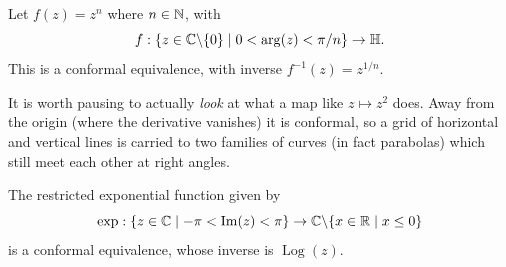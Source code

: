 \documentclass[a4paper]{scrartcl}
\begin{document}
\begin{example}
    Let $f(z) = z^n$ where $n \in \mathbb{N}$, with
    $$
    f: \{z \in \mathbb{C} \backslash \{0\} \mid 0 < \arg(z) < \pi/n\} \rightarrow \mathbb{H}.
    $$
    This is a conformal equivalence, with inverse $f^{-1}(z) = z^{1/n}$.
\end{example}

It is worth pausing to actually \emph{look} at what a map like $z \mapsto z^2$ does. Away from the origin (where the derivative vanishes) it is conformal, so a grid of horizontal and vertical lines is carried to two families of curves (in fact parabolas) which still meet each other at right angles.

\begin{center}
\end{center}

\begin{example}
The restricted exponential function given by
$$
\exp: \{z \in \mathbb{C} \mid -\pi < \operatorname{Im} (z) < \pi\} \rightarrow \mathbb{C} \backslash \{x \in \mathbb{R} \mid x \leq 0\}
$$
is a conformal equivalence, whose inverse is $\operatorname{Log}(z)$.
\end{example}
\end{document}

